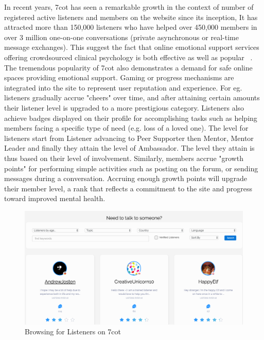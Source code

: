 In recent years, 7cot has seen a remarkable growth in the context of number of registered active listeners and members on the website since its inception, It has attracted more than 150,000 listeners who have helped over 450,000 members in over 3 million one-on-one conversations (private asynchronous or real-time message exchanges). This suggest the fact that online emotional support services offering crowdsourced clinical psychology is both effective as well as popular ~\cite {doran2015stay}. The tremendous popularity of 7cot also demonstrates a demand for safe online spaces providing emotional support. Gaming or progress mechanisms are integrated into the site to represent user reputation and experience. For eg. listeners gradually accrue "cheers" over time, and after attaining certain amounts their listener level is upgraded to a more prestigious category. Listeners also achieve badges displayed on their profile for accomplishing tasks such as helping members facing a specific type of need (e.g. loss of a loved one). The level for listeners start from Listener advancing to Peer Supporter then Mentor, Mentor Leader and finally they attain the level of Ambassador. The level they attain is thus based on their level of involvement. Similarly, members accrue "growth points" for performing simple activities such as posting on the forum, or sending messages during a conversation. Accruing enough growth points will upgrade their member level, a rank that reflects a commitment to the site and progress toward improved mental health.

\begin{figure}
	\centering %
	\includegraphics[width=5in]{interface.png} %
	\caption{Browsing for Listeners on 7cot} 
	\label{fig1}
\end{figure}

